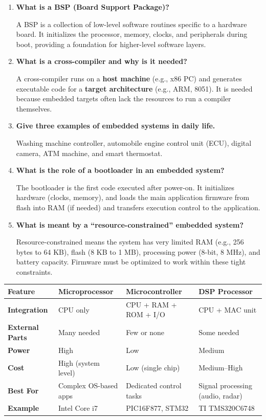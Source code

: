 \documentclass[12pt,a4paper]{article}
\newcommand{\Q}[1]{\textbf{#1}\par\noindent\ignorespaces}
\renewcommand{\arraystretch}{1.45}
\begin{document}
\begin{tcolorbox}[exambox, title={\textbf{Frequently Asked / Viva Questions}}]
\begin{enumerate}[topsep=0pt, label=\textbf{Q\arabic*.}, itemsep=5pt]
  \item \Q{What is a BSP (Board Support Package)?}
    A BSP is a collection of low-level software routines specific to a hardware board. It initializes the processor, memory, clocks, and peripherals during boot, providing a foundation for higher-level software layers.
  \item \Q{What is a cross-compiler and why is it needed?}
    A cross-compiler runs on a \textbf{host machine} (e.g., x86 PC) and generates executable code for a \textbf{target architecture} (e.g., ARM, 8051). It is needed because embedded targets often lack the resources to run a compiler themselves.
  \item \Q{Give three examples of embedded systems in daily life.}
    Washing machine controller, automobile engine control unit (ECU), digital camera, ATM machine, and smart thermostat.
  \item \Q{What is the role of a bootloader in an embedded system?}
    The bootloader is the first code executed after power-on. It initializes hardware (clocks, memory), and loads the main application firmware from flash into RAM (if needed) and transfers execution control to the application.
  \item \Q{What is meant by a ``resource-constrained'' embedded system?}
    Resource-constrained means the system has very limited RAM (e.g., 256 bytes to 64 KB), flash (8 KB to 1 MB), processing power (8-bit, 8 MHz), and battery capacity. Firmware must be optimized to work within these tight constraints.
\end{enumerate}
\end{tcolorbox}

\begin{tcolorbox}[tikzbox, title={Comparison: Microprocessor vs.\ Microcontroller vs.\ DSP}]
\par\noindent
{\renewcommand{\arraystretch}{1.55}%
\begin{tabularx}{\linewidth}{|B{2.8cm}|Y|Y|Y|}
\hline
\textbf{Feature} & \textbf{Microprocessor} & \textbf{Microcontroller} & \textbf{DSP Processor} \\
\hline
\textbf{Integration} & CPU only & CPU + RAM + ROM + I/O & CPU + MAC unit \\
\hline
\textbf{External Parts} & Many needed & Few or none & Some needed \\
\hline
\textbf{Power} & High & Low & Medium \\
\hline
\textbf{Cost} & High (system level) & Low (single chip) & Medium--High \\
\hline
\textbf{Best For} & Complex OS-based apps & Dedicated control tasks & Signal processing (audio, radar) \\
\hline
\textbf{Example} & Intel Core i7 & PIC16F877, STM32 & TI TMS320C6748 \\
\hline
\end{tabularx}}
\end{tcolorbox}
\end{document}
